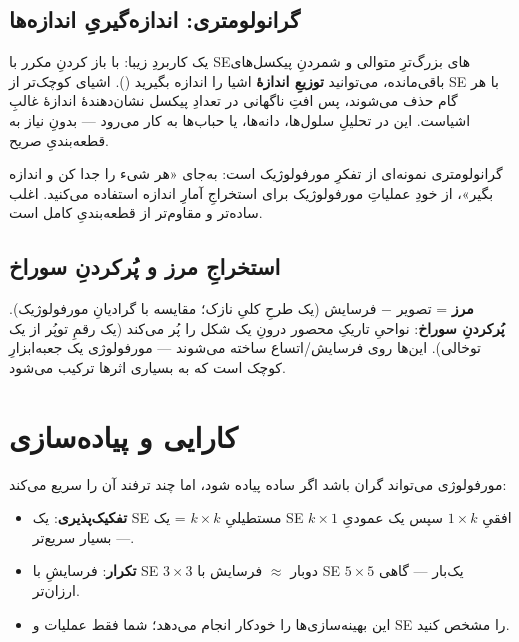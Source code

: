 \documentclass[12pt,a4paper]{article}
\begin{document}
\subsection{گرانولومتری: اندازه‌گیریِ اندازه‌ها}

یک کاربردِ زیبا: با باز کردنِ مکرر با SEهای بزرگ‌ترِ متوالی و شمردنِ پیکسل‌های باقی‌مانده، می‌توانید
\textbf{توزیعِ اندازهٔ} اشیا را اندازه بگیرید (). اشیای کوچک‌تر از SE با هر گام
حذف می‌شوند، پس افتِ ناگهانی در تعدادِ پیکسل نشان‌دهندهٔ اندازهٔ غالبِ اشیاست. این در تحلیلِ
سلول‌ها، دانه‌ها، یا حباب‌ها به کار می‌رود — بدونِ نیاز به قطعه‌بندیِ صریح.

\begin{yaddasht}
گرانولومتری نمونه‌ای از تفکرِ مورفولوژیک است: به‌جای «هر شیء را جدا کن و اندازه بگیر»، از خودِ
عملیاتِ مورفولوژیک برای استخراجِ آمارِ اندازه استفاده می‌کنید. اغلب ساده‌تر و مقاوم‌تر از قطعه‌بندیِ کامل است.
\end{yaddasht}

\subsection{استخراجِ مرز و پُرکردنِ سوراخ}

\textbf{مرز} = تصویر $-$ فرسایش (یک طرحِ کلیِ نازک؛ مقایسه با گرادیانِ مورفولوژیک).
\textbf{پُرکردنِ سوراخ}: نواحیِ تاریکِ محصور درونِ یک شکل را پُر می‌کند (یک رقمِ توپُر از یک توخالی).
این‌ها روی فرسایش/اتساع ساخته می‌شوند — مورفولوژی یک جعبه‌ابزارِ کوچک است که به بسیاری اثرها ترکیب می‌شود.

\section{کارایی و پیاده‌سازی}

مورفولوژی می‌تواند گران باشد اگر ساده پیاده شود، اما چند ترفند آن را سریع می‌کند:

\begin{itemize}
  \item \textbf{تفکیک‌پذیری}: یک SEِ مستطیلیِ $k\times k$ = یک SEِ افقیِ $1\times k$ سپس یک عمودیِ $k\times 1$ — بسیار سریع‌تر.
  \item \textbf{تکرار}: فرسایشِ با SEِ $3\times3$ دوبار $\approx$ فرسایش با SEِ $5\times5$ یک‌بار — گاهی ارزان‌تر.
  \item {} این بهینه‌سازی‌ها را خودکار انجام می‌دهد؛ شما فقط عملیات و SE را مشخص کنید.
\end{itemize}
\end{document}
